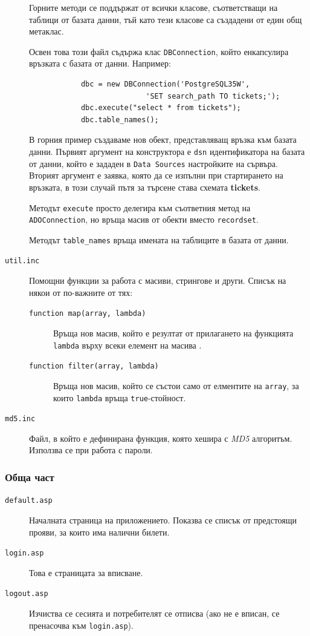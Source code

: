 \documentclass[a4paper,10pt, leqno]{article}
\newcommand{\term}[1] {\textsl{#1}}
\newcommand{\tab}[1] {\textbf{#1}}
\newcommand{\File}[1] {\texttt{#1}}
\begin{document}
\begin{description}
		    Горните методи се поддържат от всички класове, съответстващи на таблици от базата данни, тъй като тези класове
		    са създадени от един общ метаклас.

		    Освен това този файл съдържа клас \texttt{DBConnection}, който енкапсулира връзката с базата от данни.
		    Например:

		    \begin{verbatim}
		    dbc = new DBConnection('PostgreSQL35W',
		    	 		   'SET search_path TO tickets;');
		    dbc.execute("select * from tickets");
		    dbc.table_names();
		    \end{verbatim}

		    В горния пример създаваме нов обект, представляващ връзка към базата данни.
		    Първият аргумент на конструктора е \texttt{dsn} идентификатора на базата от данни, който
		    е зададен в \texttt{Data Sources} настройките на сървъра. Вторият аргумент е заявка, която да се изпълни при стартирането
		    на връзката, в този случай пътя за търсене става схемата \tab{tickets}.

		    Методът \texttt{execute} просто делегира към съответния метод на \texttt{ADOConnection}, но връща масив от обекти вместо
		    \texttt{recordset}.

		    Методът \texttt{table\_names} връща имената на таблиците в базата от данни.

		  \item[\File{util.inc}]
		    Помощни функции за работа с масиви, стрингове и други. Списък на някои от по-важните от тях:
		    \begin{description}
		      \item[\texttt{function map(array, lambda)}]
			Връща нов масив, който е резултат от прилагането на функцията \texttt{lambda} върху всеки елемент на масива .
		      \item[\texttt{function filter(array, lambda)}]
			Връща нов масив, който се състои само от елментите на \texttt{array}, за които \texttt{lambda} връща \texttt{true}-стойност.
		    \end{description}
		  \item[\File{md5.inc}]
		    Файл, в който е дефинирана функция, която хешира с \term{MD5} алгоритъм. Използва се при работа с пароли.

		\end{description}


		\subsubsection{Обща част}
		\begin{description}
		  \item[\File{default.asp}]
		    Началната страница на приложението. Показва се списък от предстоящи прояви, за които има налични билети.
		  \item[\File{login.asp}]
		    Това е страницата за вписване.
		  \item[\File{logout.asp}]
		    Изчиства се сесията и потребителят се отписва (ако не е вписан, се пренасочва към \File{login.asp}).
		\end{description}
\end{document}
